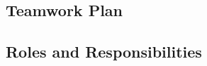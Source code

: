 \begin{multicols}{1}
\section{Teamwork Plan}
\label{sec:teamwork-plan}

\subsection{Roles and Responsibilities}
\label{subsec:roles-and-responsibilities}
\centering
\renewcommand{\arraystretch}{1.75}



\end{multicols}
